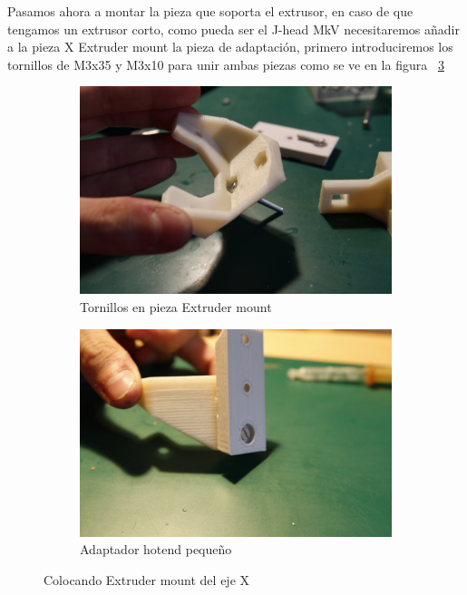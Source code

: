 			Pasamos ahora a montar la pieza que soporta el extrusor, en caso de que tengamos un extrusor corto, como pueda ser el J-head MkV necesitaremos añadir a la pieza X Extruder mount la pieza de adaptación, primero introduciremos los tornillos de M3x35 y M3x10 para unir ambas piezas como se ve en la figura ~\ref{fig:extrudermount.ejex}
			\begin{figure}[H]
			        \centering
			        \begin{subfigure}[htb]{0.4\textwidth}
			                \centering
							
			                \includegraphics[width=\textwidth]{../../Fotos/58.jpg}
			                \caption{Tornillos en pieza Extruder mount}
			                \label{fig:extruder.ejex}
			        \end{subfigure}
			        \begin{subfigure}[htb]{0.4\textwidth}
			                \centering
							
			                \includegraphics[width=\textwidth]{../../Fotos/59.jpg}
			                \caption{Adaptador hotend pequeño}
			                \label{fig:adaptador.ejex}
			        \end{subfigure}
			        \caption{Colocando Extruder mount del eje X}\label{fig:extrudermount.ejex}
			\end{figure}
